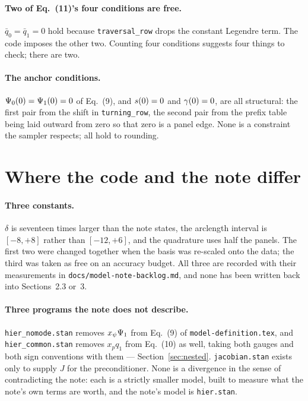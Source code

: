 \documentclass[11pt]{article}
\newcommand{\file}[1]{\texttt{#1}}
\newcommand{\code}[1]{\texttt{#1}}
\begin{document}
\paragraph{Two of Eq.~(11)'s four conditions are free.} $\bar q_{0} = \bar q_{1} = 0$ hold
because \code{traversal\_row} drops the constant Legendre term. The code imposes the other
two. Counting four conditions suggests four things to check; there are two.

\paragraph{The anchor conditions.} $\Psi_{0}(0) = \Psi_{1}(0) = 0$ of Eq.~(9), and
$s(0) = 0$ and $\gamma(0) = 0$, are all structural: the first pair from the shift in
\code{turning\_row}, the second pair from the prefix table being laid outward from zero so
that zero is a panel edge. None is a constraint the sampler respects; all hold to rounding.

\section{Where the code and the note differ}
\label{sec:differ}

\paragraph{Three constants.} $\delta$ is seventeen times larger than the note states, the
arclength interval is $[-8, +8]$ rather than $[-12, +6]$, and the quadrature uses half the
panels. The first two were changed together when the basis was re-scaled onto the data; the
third was taken as free on an accuracy budget. All three are recorded with their
measurements in \file{docs/model-note-backlog.md}, and none has been written back into
Sections~2.3 or~3.

\paragraph{Three programs the note does not describe.} \file{hier\_nomode.stan} removes
$x_{\psi}\Psi_{1}$ from Eq.~(9) of \file{model-definition.tex}, and
\file{hier\_common.stan} removes $x_p q_{1}$ from Eq.~(10) as well, taking both gauges and
both sign conventions with them --- Section~\ref{sec:nested}. \file{jacobian.stan} exists
only to supply $J$ for the preconditioner. None is a divergence in the sense of
contradicting the note: each is a strictly smaller model, built to measure what the note's
own terms are worth, and the note's model is \file{hier.stan}.
\end{document}
